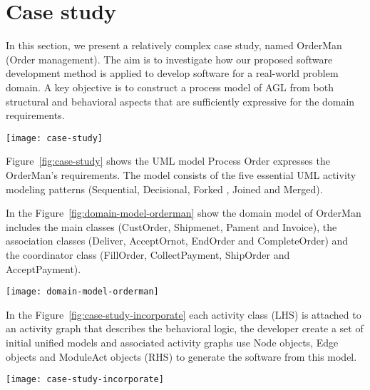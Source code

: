 \section{Case study}
\label{sect:case-study} %

In this section, we present a relatively complex case study, named OrderMan (Order management). The aim is to investigate how our proposed software development method is applied to develop software for a real-world problem domain. A key objective is to construct a process model of AGL from both structural and behavioral aspects that are sufficiently expressive for the domain requirements. 
\begin{figure*}[ht]
	\centering
	\texttt{[image: case-study]}
	\caption{the Process Order} %
	\label{fig:case-study}
\end{figure*}


Figure~\ref{fig:case-study} shows the UML model Process Order expresses the OrderMan’s requirements. The model consists of the five essential UML activity modeling patterns (Sequential, Decisional, Forked , Joined and Merged).


In the Figure~\ref{fig:domain-model-orderman} show the domain model of OrderMan includes the main classes (CustOrder, Shipmenet, Pament and Invoice), the association classes (Deliver, AcceptOrnot, EndOrder and CompleteOrder) and the coordinator class (FillOrder, CollectPayment, ShipOrder and AcceptPayment).
\begin{figure*}[ht]
	\centering
	\texttt{[image: domain-model-orderman]}
	\caption{ The essential domain model of OrderMan} %
	\label{fig:domain-model-orderman}
\end{figure*}

In the Figure~\ref{fig:case-study-incorporate} each activity class (LHS) is attached to an activity graph that describes the behavioral logic, the developer create a set of initial unified models and associated activity graphs use Node objects, Edge objects and ModuleAct objects (RHS) to generate the software from this model.
%
\begin{figure*}[ht]
	\centering
	\texttt{[image: case-study-incorporate]}
	\caption{(LHS) The the unified model; (RHS) The Node objects, Edge objects of the activity graph and ModuleAct objects that are referenced by the Nodes} %
	\label{fig:case-study-incorporate}
\end{figure*}